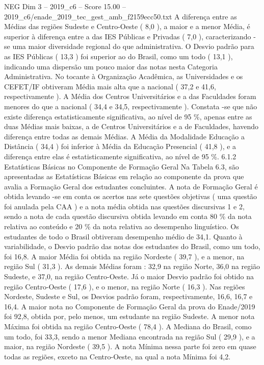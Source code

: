 \begin{textsample}{NEG Dim 3 – 2019\_c6 – Score 15.00 – 2019\_c6/enade\_2019\_tec\_gest\_amb\_f2159ecc50.txt}
A diferença entre as Médias das regiões Sudeste e Centro-Oeste ( 8,0 ), a maior e a menor Média, é superior à diferença entre a das IES Públicas e Privadas ( 7,0 ), caracterizando -se uma maior diversidade regional do que administrativa.
O Desvio padrão para as IES Públicas ( 13,3 ) foi superior ao do Brasil, como um todo ( 13,1 ), indicando uma dispersão um pouco maior das notas nesta Categoria Administrativa.
No tocante à Organização Acadêmica, as Universidades e os CEFET/IF obtiveram Média mais alta que a nacional ( 37,2 e 41,6, respectivamente ).
A Média dos Centros Universitários e a das Faculdades foram menores do que a nacional ( 34,4 e 34,5, respectivamente ).
Constata -se que não existe diferença estatisticamente significativa, ao nível de 95 \%, apenas entre as duas Médias mais baixas, a de Centros Universitários e a de Faculdades, havendo diferença entre todas as demais Médias.
A Média da Modalidade Educação a Distância ( 34,4 ) foi inferior à Média da Educação Presencial ( 41,8 ), e a diferença entre elas é estatisticamente significativa, ao nível de 95 \%. 6.1.2 Estatísticas Básicas no Componente de Formação Geral Na Tabela 6.3, são apresentadas as Estatísticas Básicas em relação ao componente da prova que avalia a Formação Geral dos estudantes concluintes.
A nota de Formação Geral é obtida levando -se em conta os acertos nas sete questões objetivas ( uma questão foi anulada pela CAA ) e a nota média obtida nas questões discursivas 1 e 2, sendo a nota de cada questão discursiva obtida levando em conta 80 \% da nota relativa ao conteúdo e 20 \% da nota relativa ao desempenho linguístico.
Os estudantes de todo o Brasil obtiveram desempenho médio de 34,1.
Quanto à variabilidade, o Desvio padrão das notas dos estudantes do Brasil, como um todo, foi 16,8.
A maior Média foi obtida na região Nordeste ( 39,7 ), e a menor, na região Sul ( 31,3 ).
As demais Médias foram : 32,9 na região Norte, 36,0 na região Sudeste, e 37,0, na região Centro-Oeste.
Já o maior Desvio padrão foi obtido na região Centro-Oeste ( 17,6 ), e o menor, na região Norte ( 16,3 ).
Nas regiões Nordeste, Sudeste e Sul, os Desvios padrão foram, respectivamente, 16,6, 16,7 e 16,4.
A maior nota no Componente de Formação Geral da prova do Enade/2019 foi 92,8, obtida por, pelo menos, um estudante na região Sudeste.
A menor nota Máxima foi obtida na região Centro-Oeste ( 78,4 ).
A Mediana do Brasil, como um todo, foi 33,3, sendo a menor Mediana encontrada na região Sul ( 29,9 ), e a maior, na região Nordeste ( 39,5 ).
A nota Mínima nessa parte foi zero em quase todas as regiões, exceto na Centro-Oeste, na qual a nota Mínima foi 4,2.

\end{textsample}
